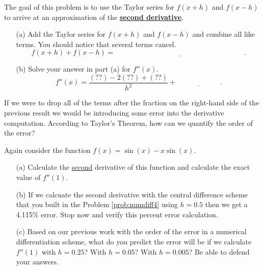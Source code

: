\begin{problem}\label{prob:numdiff4}
    The goal of this problem is to use the Taylor series for $f(x+h)$ and $f(x-h)$ to arrive at an approximation of the
    \underline{ {\bf second derivative}}. 
    \begin{enumerate}
        \item[(a)] Add the Taylor series for $f(x+h)$ and $f(x-h)$ and combine all like
            terms.  You should notice that several terms cancel.
            \[ f(x+h) + f(x-h) = \underline{\hspace{3in}}. \]
        \item[(b)] Solve your answer in part (a) for $f''(x)$.
            \[ f''(x) = \frac{(??) - 2 (??) + (??)}{h^2} + \underline{\hspace{1in}}. \]
    \end{enumerate}
\end{problem}

\begin{problem}
    If we were to drop all of the terms after the fraction on the right-hand side of the
    previous result we would be introducing some error into the derivative computation.
    According to Taylor's Theorem, how can we quantify the order of the error?  
\end{problem}

\begin{problem}
    Again consider the function $f(x) = \sin(x) - x\sin(x)$. 
    \begin{enumerate}
        \item[(a)] Calculate the \underline{second} derivative of this function and
            calculate the exact value of $f''(1)$.
        \item[(b)] If we calcuate the second derivative with the central difference scheme
            that you built in the Problem \ref{prob:numdiff4} using $h = 0.5$ then we get
            a 4.115\% error.  Stop now and verify this percent error calculation.  
        \item[(c)] Based on our previous work with the order of the error in a numerical
            differentiation scheme, what do you predict the error will be if we calculate
            $f''(1)$ with $h = 0.25$?  With $h = 0.05$?  With $h = 0.005$?  Be able to
            defend your answers.
    \end{enumerate}
\end{problem}



